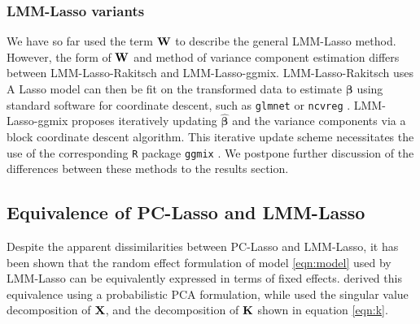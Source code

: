 \subsubsection{LMM-Lasso variants}
\label{sec:rak-ggmix}

We have so far used the term $\textbf{W}$ to describe the general LMM-Lasso method. However, the form of $\textbf{W}$ and method of variance component estimation differs between LMM-Lasso-Rakitsch and LMM-Lasso-ggmix. LMM-Lasso-Rakitsch \cite{Rakitsch2012} uses  A Lasso model can then be fit on the transformed data to estimate $\boldsymbol{\beta}$ using standard software for coordinate descent, such as \texttt{glmnet} \cite{glmnet} or \texttt{ncvreg} \cite{ncvreg}. LMM-Lasso-ggmix \cite{bhatnagar2019simultaneous} proposes iteratively updating $\widehat{\boldsymbol{\beta}}$ and the variance components via a block coordinate descent algorithm. This iterative update scheme necessitates the use of the corresponding \texttt{R} package \texttt{ggmix} \cite{ggmix, bhatnagar2019simultaneous}. We postpone further discussion of the differences between these methods to the results section.



\subsection{Equivalence of PC-Lasso and LMM-Lasso}

 

Despite the apparent dissimilarities between PC-Lasso and LMM-Lasso, it has been shown that the random effect formulation of model \ref{eqn:model} used by LMM-Lasso can be equivalently expressed in terms of fixed effects. \cite{zhang2015principal} derived this equivalence using a probabilistic PCA formulation, while \cite{hoffman2013correcting} used the singular value decomposition of $\textbf{X}$, and the decomposition of $\textbf{K}$ shown in equation \eqref{eqn:k}.  

